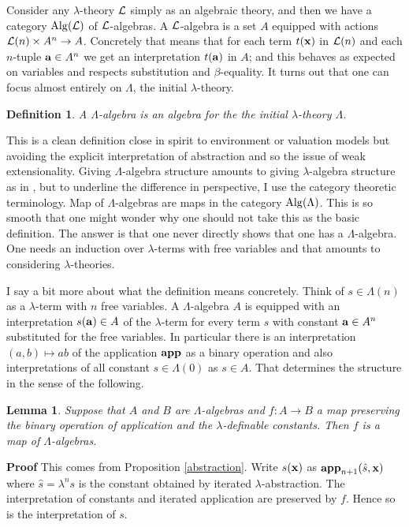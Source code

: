 \documentclass[12pt, amstex, amssymb]{article}
\newtheorem{lemma}[theorem]{Lemma}
\newtheorem{definition}[theorem]{Definition}
\newcommand{\mcat}{\cal}
\begin{document}
Consider any $\lambda$-theory $\mcat L$ simply 
as an algebraic theory,
and then we have a category ${\rm Alg}({\mcat L})$
of $\mcat L$-algebras. 
A $\mcat L$-algebra is a set $A$ equipped with actions 
${\mcat L} (n) \times A^n \to A$. 
Concretely that means that for each term $t({\bf x})$ 
in ${\mcat L} (n)$ and each $n$-tuple ${\bf a} \in A^n$
we get an interpretation $t({\bf a})$ in $A$; and this
behaves as expected on variables and respects substitution
and $\beta$-equality.
It turns out that one can focus almost entirely
on  $\Lambda$, the initial $\lambda$-theory.
\begin{definition}
A {\em $\Lambda$-algebra} is an algebra for the the initial
$\lambda$-theory $\Lambda$.
\end{definition}
This is a clean definition close in spirit to environment
or valuation models but avoiding the explicit interpretation
of abstraction and so the issue of weak 
extensionality. Giving $\Lambda$-algebra structure 
amounts to giving $\lambda$-algebra structure as in \cite{Bar81},
but to underline the difference in perspective, I use the category theoretic
terminology. Map of $\Lambda$-algebras are 
maps in the category ${\rm Alg}(\Lambda)$. This is
so smooth that one might wonder why one should not take this
as the basic definition. The answer is that one never
directly shows that one has a $\Lambda$-algebra. One needs an
induction over $\lambda$-terms with free variables and 
that amounts to considering $\lambda$-theories.

I say a bit more about what the definition means concretely.
Think of $s \in \Lambda (n)$ as a $\lambda$-term with $n$
free variables. A $\Lambda$-algebra $A$ is equipped with an
interpretation $s({\bf a}) \in A$ of the $\lambda$-term 
for every term $s$ with constant ${\bf a} \in A^n$ substituted
for the free variables. In particular there is an interpretation
$(a,b) \mapsto ab$ of the application $\bf app$ as a binary operation
and also interpretations of all constant $s \in \Lambda (0)$
as $s \in A$. That determines the structure in the sense of the
following.
\begin{lemma}\label{appconst}
Suppose that $A$ and $B$ are $\Lambda$-algebras and $f:A \to B$
a map preserving the binary operation of application and the 
$\lambda$-definable constants. Then $f$ is a map of
$\Lambda$-algebras. 
\end{lemma} 
{\bf Proof} This comes from Proposition \ref{abstraction}.
Write $s({\bf x})$ as ${\bf app}_{n+1}(\hat{s}, {\bf x})$
where $\hat{s} = \lambda^n s$ is the constant obtained by
iterated 
$\lambda$-abstraction. The interpretation of constants and 
iterated application are preserved by $f$. Hence so is the
interpretation of $s$.\\[0.2em]
\end{document}
